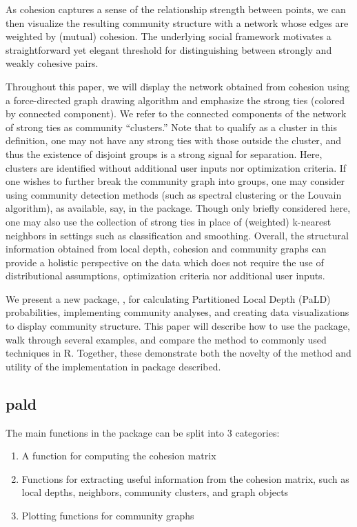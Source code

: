 As cohesion captures a sense of the relationship strength between
points, we can then visualize the resulting community structure with a
network whose edges are weighted by (mutual) cohesion. The underlying
social framework motivates a straightforward yet elegant threshold for
distinguishing between strongly and weakly cohesive pairs.

Throughout this paper, we will display the network obtained from
cohesion using a force-directed graph drawing algorithm and emphasize
the strong ties (colored by connected component). We refer to the
connected components of the network of strong ties as community
``clusters.'' Note that to qualify as a cluster in this definition, one
may not have any strong ties with those outside the cluster, and thus
the existence of disjoint groups is a strong signal for separation.
Here, clusters are identified without additional user inputs nor
optimization criteria. If one wishes to further break the community
graph into groups, one may consider using community detection methods
(such as spectral clustering or the Louvain algorithm), as available,
say, in the  package. Though only briefly considered
here, one may also use the collection of strong ties in place of
(weighted) k-nearest neighbors in settings such as classification and
smoothing. Overall, the structural information obtained from local
depth, cohesion and community graphs can provide a holistic perspective
on the data which does not require the use of distributional
assumptions, optimization criteria nor additional user inputs.

We present a new package, , for calculating Partitioned
Local Depth (PaLD) probabilities, implementing community analyses, and
creating data visualizations to display community structure. This paper
will describe how to use the package, walk through several examples, and
compare the method to commonly used techniques in R. Together, these
demonstrate both the novelty of the method and utility of the
implementation in package described.

\hypertarget{pald}{%
\subsection{pald}\label{pald}}

The main functions in the  package can be split into 3
categories:

\begin{enumerate}
\def\labelenumi{\arabic{enumi}.}
\tightlist
\item
  A function for computing the cohesion matrix
\item
  Functions for extracting useful information from the cohesion matrix,
  such as local depths, neighbors, community clusters, and graph objects
\item
  Plotting functions for community graphs
\end{enumerate}

